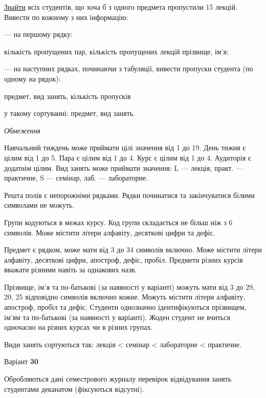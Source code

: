 \documentclass[11pt, ukrainian]{article}
\begin{document}
\underline{Знайти} всіх студентів, що хоча б з одного предмета пропустили 15 лекцій. Вивести по кожному з них інформацію:\par
{\noindent}--- на першому рядку:\par
кількість пропущених пар, кількість пропущених лекцій прізвище, ім’я;

{\noindent}--- на наступних рядках, починаючи з табуляції, вивести пропуски студента (по одному на рядок):\par
предмет, вид занять, кількість пропусків

{\noindent}у такому сортуванні: предмет, вид занять.


\bigskip\textit{Обмеження}

Навчальний тиждень може приймати цілі значення від 1 до 19.
День тижня є цілим від 1 до 5. Пара є цілим від 1 до 4.
Курс є цілим від 1 до 4. Аудиторія є додатнім цілим.
Вид занять може приймати значення:
L --- лекція, практ. --- практичне, S --- семінар, лаб. --- лабораторне.

Решта полів є непорожніми рядками.
Рядки починатися та закінчуватися білими символами не можуть.

Групи кодуються в межах курсу.
Код групи складається не більш ніж з 6 символів.
Може містити літери алфавіту, десяткові цифри та дефіс.

Предмет є рядком, може мати від 3 до 34 символів включно.
Може містити літери алфавіту, десяткові цифри, апостроф, дефіс, пробіл.
Предмети різних курсів вважати різними навіть за однакових назв.

Прізвище, ім’я та по-батькові (за наявності у варіанті)
можуть мати від 3 до 29, 20, 25 відповідно символів включно кожне.
Можуть містити літери алфавіту, апостроф, пробіл та дефіс.
Студенти однозначно ідентифікуються прізвищем, ім’ям та по-батькові (за наявності у варіанті).
Жоден студент не вчиться одночасно на різних курсах чи в різних групах.

Види занять сортуються так: лекція < семінар < лабораторне < практичне.



\par
\newpage
{\center Варіант  \No \textbf { 30 }\par}
\bigskip
Обробляються дані семестрового журналу перевірок відвідування занять студентами деканатом (фіксуються відсутні). 
\end{document}
